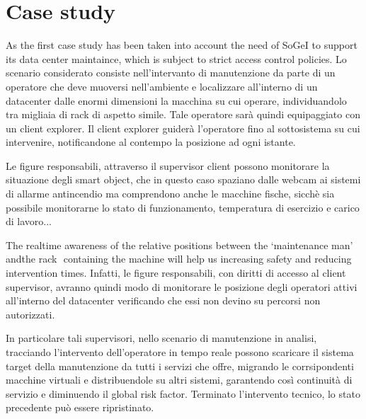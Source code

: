 \section{Case study}\label{case-study}

As the first case study has been taken into account the need of SoGeI to support its data center maintaince, which is subject to strict access control policies. 
Lo scenario considerato consiste nell'intervanto di manutenzione da parte di un operatore che deve muoversi nell'ambiente e localizzare all'interno di un datacenter dalle enormi dimensioni la macchina su cui operare, individuandolo tra migliaia di rack di aspetto simile. Tale operatore sarà quindi equipaggiato con un client explorer. Il client explorer guiderà l'operatore fino al sottosistema su cui intervenire, notificandone al contempo la posizione ad ogni istante.

Le figure responsabili, attraverso il supervisor client possono monitorare la situazione degli smart object, che in questo caso spaziano dalle webcam ai sistemi di allarme antincendio ma comprendono anche le macchine fische, sicchè sia possibile monitorarne lo stato di funzionamento, temperatura di esercizio e carico di lavoro...


The real­time awareness of the relative positions between
the ‘maintenance man' andthe rack ­ containing the machine­ will help us
increasing safety and reducing intervention times.
Infatti, le figure responsabili, con diritti di accesso al client supervisor, avranno quindi modo di monitorare le posizione degli operatori attivi all'interno del datacenter verificando che essi non devino su percorsi non autorizzati.

In particolare tali supervisori, nello scenario di manutenzione in analisi, tracciando l'intervento dell'operatore in tempo reale possono scaricare il sistema target della manutenzione da tutti i servizi che offre, migrando le corrsipondenti macchine virtuali e distribuendole su altri sistemi, garantendo così continuità di servizio e diminuendo il global risk factor. Terminato l'intervento tecnico, lo stato precedente può essere ripristinato. 







